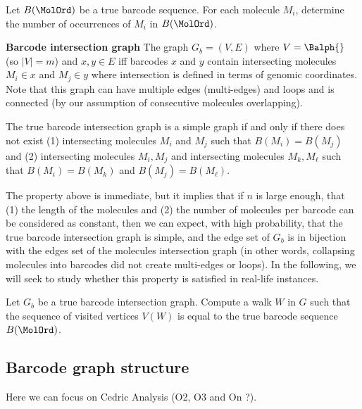 \begin{problem}
    \label{def:problem1}
    Let  $B(\MolOrd)$ be a true barcode sequence. For each molecule $M_i$, determine the number of occurrences of $M_i$ in  $B(\MolOrd)$.
\end{problem}

\noindent \textbf{Barcode intersection graph} The graph $G_b=(V,E)$ where $V=\Balph{}$ (so $|V|=m$) and ${x,y}\in E$ iff barcodes $x$ and $y$ contain intersecting molecules $M_i \in x$ and $M_j\in y$ where intersection is defined in terms of genomic coordinates. 
Note that this graph can have multiple edges (multi-edges) and loops and is connected (by our assumption of consecutive molecules overlapping). 

\begin{property}
    \label{prop:simple} The true barcode intersection graph is a simple graph if and only if there does not exist (1) intersecting molecules $M_i$ and $M_j$ such that $B(M_i)=B(M_j)$ and (2) intersecting molecules $M_i, M_j$ and intersecting molecules $M_k,M_\ell$ such that $B(M_i)=B(M_k)$ and $B(M_j)=B(M_\ell)$. 
\end{property}

The property above is immediate, but it implies that if $n$ is large enough, that (1) the length of the molecules and (2) the number of molecules per barcode can be considered as constant, then we can expect, with high probability, that the true barcode intersection graph is simple, and the edge set of $G_b$ is in bijection with the edges set of the molecules intersection graph (in other words, collapsing molecules into barcodes did not create multi-edges or loops). In the following, we will seek to study whether this property is satisfied in real-life instances.



\begin{problem}
    \label{def:problem2}
    Let $G_b$ be a true barcode intersection graph. Compute a walk $W$ in $G$ such that the sequence of visited vertices $V(W)$ is equal to the true barcode sequence $B(\MolOrd)$.
\end{problem}

\subsection{Barcode graph structure}

Here we can focus on Cedric Analysis (O2, O3 and On ?).

